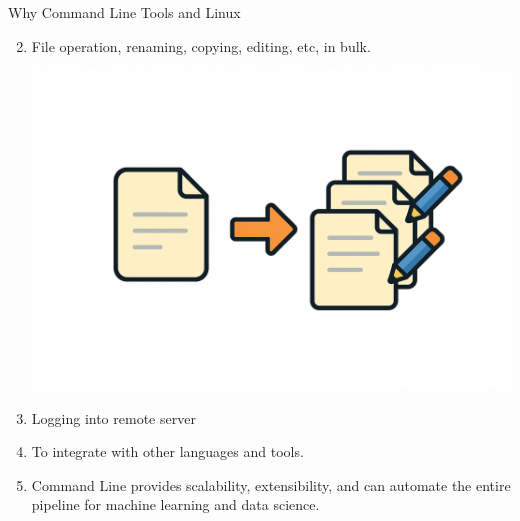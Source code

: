 \documentclass[aspectratio=169,xcolor=dvipsnames,svgnames,x11names,fleqn]{beamer}
\begin{document}
\begin{frame}{Why Command Line Tools and Linux}

\begin{enumerate}
    \setcounter{enumi}{1}
    \item File operation, renaming, copying, editing, etc, in bulk. 
    \begin{center}
        \includegraphics[height=.4\textheight]{figures/FileOperation.png}
    \end{center}

\item Logging into remote server

\item To integrate with other languages and tools.

\item Command Line provides scalability, extensibility, and can automate the entire pipeline for machine learning and data science.


\end{enumerate}
    
\end{frame}
\end{document}
